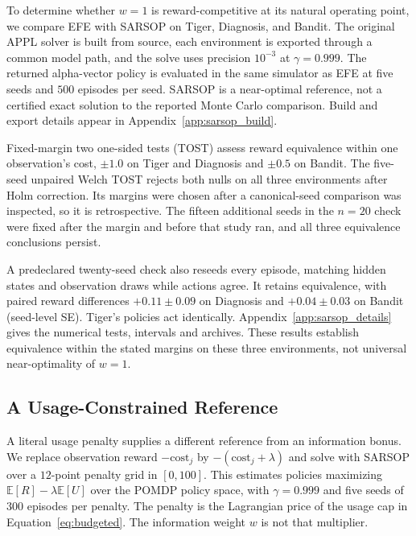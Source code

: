 \documentclass[runningheads]{llncs}
\begin{document}
To determine whether $w{=}1$ is reward-competitive at its natural operating point, we compare EFE with SARSOP \citep{kurniawati2008} on Tiger, Diagnosis, and Bandit. The original APPL solver is built from source, each environment is exported through a common model path, and the solve uses precision $10^{-3}$ at $\gamma{=}0.999$. The returned alpha-vector policy is evaluated in the same simulator as EFE at five seeds and $500$ episodes per seed. SARSOP is a near-optimal reference, not a certified exact solution to the reported Monte Carlo comparison. Build and export details appear in Appendix~\ref{app:sarsop_build}.

Fixed-margin two one-sided tests (TOST) \citep{schuirmann1987} assess reward equivalence within one observation's cost, $\pm1.0$ on Tiger and Diagnosis and $\pm0.5$ on Bandit. The five-seed unpaired Welch TOST rejects both nulls on all three environments after Holm correction. Its margins were chosen after a canonical-seed comparison was inspected, so it is retrospective. The fifteen additional seeds in the $n=20$ check were fixed after the margin and before that study ran, and all three equivalence conclusions persist.

A predeclared twenty-seed check also reseeds every episode, matching hidden states and observation draws while actions agree. It retains equivalence, with paired reward differences $+0.11\pm0.09$ on Diagnosis and $+0.04\pm0.03$ on Bandit (seed-level SE). Tiger's policies act identically. Appendix~\ref{app:sarsop_details} gives the numerical tests, intervals and archives. These results establish equivalence within the stated margins on these three environments, not universal near-optimality of $w=1$.

\subsection{A Usage-Constrained Reference}
\label{sec:cpomdp}

A literal usage penalty supplies a different reference from an information bonus. We replace observation reward $-\mathrm{cost}_j$ by $-(\mathrm{cost}_j+\lambda)$ and solve with SARSOP over a $12$-point penalty grid in $[0,100]$. This estimates policies maximizing $\mathbb E[R]-\lambda\mathbb E[U]$ over the POMDP policy space, with $\gamma{=}0.999$ and five seeds of $300$ episodes per penalty. The penalty is the Lagrangian price of the usage cap in Equation~\ref{eq:budgeted}. The information weight $w$ is not that multiplier.
\end{document}
